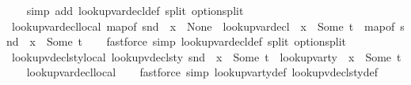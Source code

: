 \begin{isabellebody}
%
\isadelimproof
\ \ %
\endisadelimproof
%
\isatagproof
{}\isamarkupfalse%
\ {\isacharparenleft}{\kern0pt}simp\ add{\isacharcolon}{\kern0pt}\ lookup{\isacharunderscore}{\kern0pt}var{\isacharunderscore}{\kern0pt}decl{\isacharunderscore}{\kern0pt}def\ split{\isacharcolon}{\kern0pt}\ option{\isachardot}{\kern0pt}split{\isacharparenright}{\kern0pt}%
\endisatagproof
{\isafoldproof}%
%
\isadelimproof
\isanewline
%
\endisadelimproof
\isanewline
{}\isamarkupfalse%
\ lookup{\isacharunderscore}{\kern0pt}var{\isacharunderscore}{\kern0pt}decl{\isacharunderscore}{\kern0pt}local{\isacharunderscore}{\kern0pt}{}{\isacharcolon}{\kern0pt}\ {\isachardoublequoteopen}map{\isacharunderscore}{\kern0pt}of\ {\isacharparenleft}{\kern0pt}snd\ {\isasymLambda}{\isacharparenright}{\kern0pt}\ x\ {\isasymnoteq}\ None\ {\isasymLongrightarrow}\ lookup{\isacharunderscore}{\kern0pt}var{\isacharunderscore}{\kern0pt}decl\ {\isasymLambda}\ x\ {\isacharequal}{\kern0pt}\ Some\ t\ {\isasymLongrightarrow}\ map{\isacharunderscore}{\kern0pt}of\ {\isacharparenleft}{\kern0pt}snd\ {\isasymLambda}{\isacharparenright}{\kern0pt}\ x\ {\isacharequal}{\kern0pt}\ Some\ t{\isachardoublequoteclose}\isanewline
%
\isadelimproof
\ \ %
\endisadelimproof
%
\isatagproof
{}\isamarkupfalse%
\ {\isacharparenleft}{\kern0pt}fastforce\ simp{\isacharcolon}{\kern0pt}\ lookup{\isacharunderscore}{\kern0pt}var{\isacharunderscore}{\kern0pt}decl{\isacharunderscore}{\kern0pt}def\ split{\isacharcolon}{\kern0pt}\ option{\isachardot}{\kern0pt}split{\isacharparenright}{\kern0pt}%
\endisatagproof
{\isafoldproof}%
%
\isadelimproof
\isanewline
%
\endisadelimproof
\isanewline
{}\isamarkupfalse%
\ lookup{\isacharunderscore}{\kern0pt}vdecls{\isacharunderscore}{\kern0pt}ty{\isacharunderscore}{\kern0pt}local{\isacharunderscore}{\kern0pt}{}{\isacharcolon}{\kern0pt}\ {\isachardoublequoteopen}lookup{\isacharunderscore}{\kern0pt}vdecls{\isacharunderscore}{\kern0pt}ty\ {\isacharparenleft}{\kern0pt}snd\ {\isasymLambda}{\isacharparenright}{\kern0pt}\ x\ {\isacharequal}{\kern0pt}\ Some\ t\ {\isasymLongrightarrow}\ lookup{\isacharunderscore}{\kern0pt}var{\isacharunderscore}{\kern0pt}ty\ {\isasymLambda}\ x\ {\isacharequal}{\kern0pt}\ Some\ t{\isachardoublequoteclose}\isanewline
%
\isadelimproof
\ \ %
\endisadelimproof
%
\isatagproof
{}\isamarkupfalse%
\ lookup{\isacharunderscore}{\kern0pt}var{\isacharunderscore}{\kern0pt}decl{\isacharunderscore}{\kern0pt}local\isanewline
\ \ \isamarkupfalse%
\ {\isacharparenleft}{\kern0pt}fastforce\ simp{\isacharcolon}{\kern0pt}\ lookup{\isacharunderscore}{\kern0pt}var{\isacharunderscore}{\kern0pt}ty{\isacharunderscore}{\kern0pt}def\ lookup{\isacharunderscore}{\kern0pt}vdecls{\isacharunderscore}{\kern0pt}ty{\isacharunderscore}{\kern0pt}def{\isacharparenright}{\kern0pt}%

\end{isabellebody}
